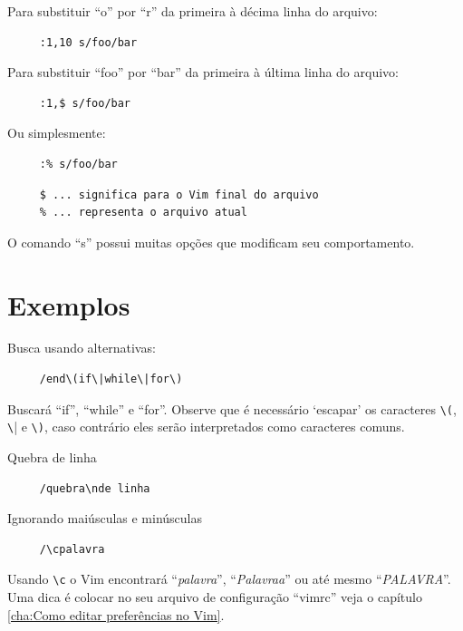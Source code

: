 \documentclass[10pt,a4paper,openany]{book}
\begin{document}
Para substituir ``o'' por ``r'' da primeira à décima linha do arquivo:

\begin{verbatim}
     :1,10 s/foo/bar
\end{verbatim}

Para substituir ``foo'' por ``bar'' da primeira à última linha do arquivo:

\begin{verbatim}
     :1,$ s/foo/bar
\end{verbatim}

Ou simplesmente:

\begin{verbatim}
     :% s/foo/bar
\end{verbatim}

\begin{verbatim}
     $ ... significa para o Vim final do arquivo
     % ... representa o arquivo atual
\end{verbatim}

O comando ``s'' possui muitas opções que modificam seu comportamento.

\section{Exemplos }
\label{Exemplos }

Busca usando alternativas:

\begin{verbatim}
     /end\(if\|while\|for\)
\end{verbatim}

Buscará ``if'', ``while'' e ``for''.  Observe que é necessário `escapar' os
caracteres \verb|\(|, \verb|\|| e \verb|\)|, caso contrário eles serão
interpretados como caracteres comuns.

Quebra de linha

\begin{verbatim}
     /quebra\nde linha
\end{verbatim}

Ignorando maiúsculas e minúsculas

\begin{verbatim}
     /\cpalavra
\end{verbatim}

Usando \verb|\c| o Vim encontrará ``{\em{palavra}}'', ``{\em{Palavraa}}'' ou
até mesmo ``{\em{PALAVRA}}''. Uma dica é colocar no seu arquivo de
configuração ``vimrc'' veja o capítulo \ref{cha:Como editar preferências no Vim}.
\end{document}
